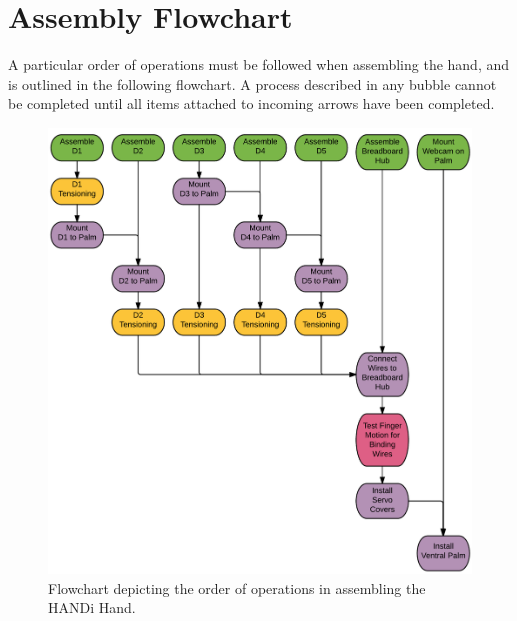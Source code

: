
\chapter{Assembly Flowchart}  %

\label {Assembly Flowchart} 
%
%
A particular order of operations must be followed when assembling the hand, and is outlined in the following flowchart. A process described in any bubble cannot be completed until all items attached to incoming arrows have been completed.
\begin{figure}
\centering
\includegraphics[width=\linewidth]{Figures/flowchart.png}
\caption{Flowchart depicting the order of operations in assembling the HANDi Hand.}
\label{fig:flowchart}
\end{figure}
